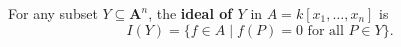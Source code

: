 For any subset $Y \subseteq \mathbf{A}^n$, the \textbf{ideal of $Y$} in $A = k[x_1, \ldots, x_n]$ is
$$I(Y) = \{ f \in A \mid f(P) = 0 \text{ for all } P \in Y \}.$$
